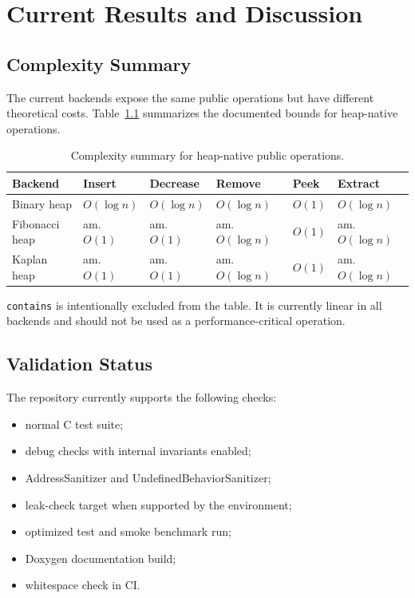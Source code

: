 \chapter{Current Results and Discussion}

\section{Complexity Summary}

The current backends expose the same public operations but have different theoretical costs.
Table~\ref{tab:complexity-summary} summarizes the documented bounds for heap-native operations.

\begin{table}[H]
    \centering
    \begin{tabular}{llllll}
        \toprule
        Backend        & Insert      & Decrease    & Remove          & Peek   & Extract         \\
        \midrule
        Binary heap    & $O(\log n)$ & $O(\log n)$ & $O(\log n)$     & $O(1)$ & $O(\log n)$     \\
        Fibonacci heap & am. $O(1)$  & am. $O(1)$  & am. $O(\log n)$ & $O(1)$ & am. $O(\log n)$ \\
        Kaplan heap    & am. $O(1)$  & am. $O(1)$  & am. $O(\log n)$ & $O(1)$ & am. $O(\log n)$ \\
        \bottomrule
    \end{tabular}
    \caption{Complexity summary for heap-native public operations.}
    \label{tab:complexity-summary}
\end{table}

\texttt{contains} is intentionally excluded from the table.
It is currently linear in all backends and should not be used as a performance-critical operation.

\section{Validation Status}

The repository currently supports the following checks:

\begin{itemize}
    \item normal C test suite;
    \item debug checks with internal invariants enabled;
    \item AddressSanitizer and UndefinedBehaviorSanitizer;
    \item leak-check target when supported by the environment;
    \item optimized test and smoke benchmark run;
    \item Doxygen documentation build;
    \item whitespace check in CI.
\end{itemize}

